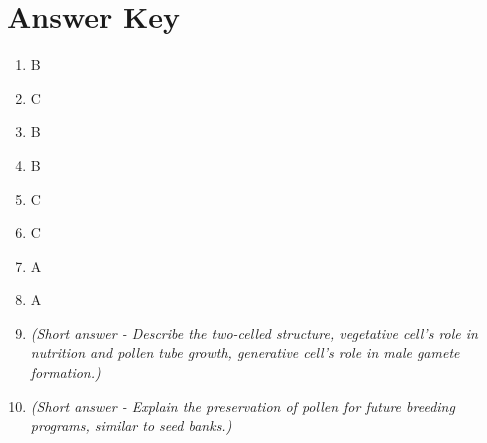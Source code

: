 \documentclass{article}
\begin{document}
\section*{Answer Key}
\begin{enumerate}
    \item B
    \item C
    \item B
    \item B
    \item C
    \item C
    \item A
    \item A
    \item \textit{(Short answer -  Describe the two-celled structure, vegetative cell's role in nutrition and pollen tube growth, generative cell's role in male gamete formation.)}
    \item \textit{(Short answer - Explain the preservation of pollen for future breeding programs, similar to seed banks.)}
\end{enumerate}
\end{document}
